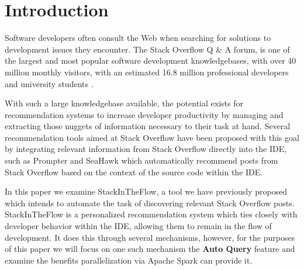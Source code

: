 \documentclass[conference]{IEEEtran}
\newcommand{\so}{Stack Overflow\xspace}
\newcommand{\sitf}{{\sc StackInTheFlow}\xspace}
\begin{document}
\begin{abstract}
The Apache Spark cluster-computing framework has the potential to drastically reduce the runtimes of tasks which are sufficiently parallelizable.  In this paper we present an examination of this capability through the use case of optimizing \sitf, a tool that generates interpretable queries to \so at the developer's behest.  Through our analysis, we observe that we can reduce the runtime of a step of the query generation process in half by leveraging Apache Spark.
\end{abstract}





%
\IEEEpeerreviewmaketitle

\section{Introduction}
Software developers often consult the Web when searching for solutions to development issues they encounter.  The \so Q \& A forum, is one of the largest and most popular software development knowledgebases, with over 40 million monthly visitors, with an estimated 16.8 million professional developers and university students \cite{so_survey_2017}.

With such a large knowledgebase available, the potential exists for recommendation systems to increase developer productivity by managing and extracting those nuggets of information necessary to their task at hand.  Several recommendation tools aimed at \so have been proposed with this goal by integrating relevant information from \so directly into the IDE, such as Prompter \cite{ponzanelli2014mining} and SeaHawk \cite{ponzanelli2013seahawk} which automatically recommend posts from \so based on the context of the source code within the IDE.

In this paper we examine \sitf, a tool we have previously proposed which intends to automate the task of discovering relevant \so posts. \sitf is a personalized recommendation system which ties closely with developer behavior within the IDE, allowing them to remain in the flow of development.  It does this through several mechanisms, however, for the purposes of this paper we will focus on one such mechanism the \textbf{Auto Query} feature and examine the benefits parallelization via Apache Spark can provide it.
\end{document}
